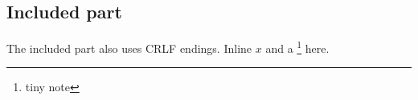 \subsection{Included part}
The included part also uses CRLF endings.
Inline $x$ and a \footnote{tiny note} here.
